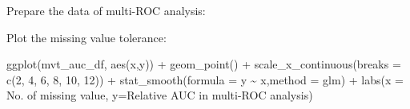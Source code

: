 \documentclass[
  12pt,
]{book}
\newenvironment{Shaded}{\begin{snugshade}}{\end{snugshade}}
\newcommand{\AttributeTok}[1]{\textcolor[rgb]{0.77,0.63,0.00}{#1}}
\newcommand{\CommentTok}[1]{\textcolor[rgb]{0.56,0.35,0.01}{\textit{#1}}}
\newcommand{\ControlFlowTok}[1]{\textcolor[rgb]{0.13,0.29,0.53}{\textbf{#1}}}
\newcommand{\DecValTok}[1]{\textcolor[rgb]{0.00,0.00,0.81}{#1}}
\newcommand{\FunctionTok}[1]{\textcolor[rgb]{0.00,0.00,0.00}{#1}}
\newcommand{\NormalTok}[1]{#1}
\newcommand{\OtherTok}[1]{\textcolor[rgb]{0.56,0.35,0.01}{#1}}
\newcommand{\SpecialCharTok}[1]{\textcolor[rgb]{0.00,0.00,0.00}{#1}}
\newcommand{\StringTok}[1]{\textcolor[rgb]{0.31,0.60,0.02}{#1}}
\begin{document}
Prepare the data of multi-ROC analysis:

\begin{Shaded}
\end{Shaded}

Plot the missing value tolerance:

\begin{Shaded}
\begin{Highlighting}[]
\FunctionTok{ggplot}\NormalTok{(mvt\_auc\_df, }\FunctionTok{aes}\NormalTok{(x,y)) }\SpecialCharTok{+}
  \FunctionTok{geom\_point}\NormalTok{() }\SpecialCharTok{+}
  \FunctionTok{scale\_x\_continuous}\NormalTok{(}\AttributeTok{breaks =} \FunctionTok{c}\NormalTok{(}\DecValTok{2}\NormalTok{, }\DecValTok{4}\NormalTok{, }\DecValTok{6}\NormalTok{, }\DecValTok{8}\NormalTok{, }\DecValTok{10}\NormalTok{, }\DecValTok{12}\NormalTok{)) }\SpecialCharTok{+} 
  \FunctionTok{stat\_smooth}\NormalTok{(}\AttributeTok{formula =}\NormalTok{ y }\SpecialCharTok{\textasciitilde{}}\NormalTok{ x,}\AttributeTok{method =} \StringTok{\textquotesingle{}glm\textquotesingle{}}\NormalTok{) }\SpecialCharTok{+}
  \FunctionTok{labs}\NormalTok{(}\AttributeTok{x =} \StringTok{\textquotesingle{}No. of missing value\textquotesingle{}}\NormalTok{, }
       \AttributeTok{y=}\StringTok{\textquotesingle{}Relative AUC in multi{-}ROC analysis\textquotesingle{}}\NormalTok{)}
\end{Highlighting}
\end{Shaded}
\end{document}
